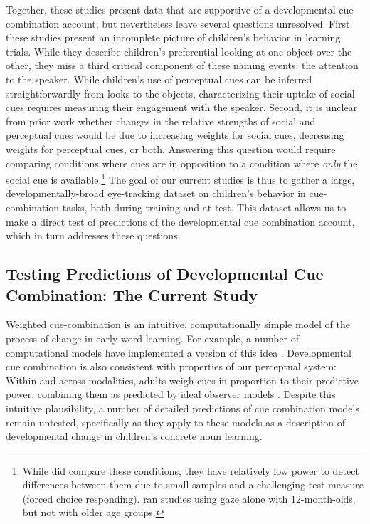 \documentclass[man,floatsintext]{apa6}
\begin{document}
Together, these studies present data that are supportive of a developmental cue combination account, but nevertheless leave several questions unresolved. First, these studies present an incomplete picture of children's behavior in learning trials. While they describe children's preferential looking at one object over the other, they miss a third critical component of these naming events: the attention to the speaker. While children's use of perceptual cues can be inferred straightforwardly from looks to the objects, characterizing their uptake of social cues requires measuring their engagement with the speaker. Second, it is unclear from prior work whether changes in the relative strengths of social and perceptual cues would be due to increasing weights for social cues, decreasing weights for perceptual cues, or both. Answering this question would require comparing conditions where cues are in opposition to a condition where \emph{only} the social cue is available.\footnote{While  did compare these conditions, they have relatively low power to detect differences between them due to small samples and a challenging test measure (forced choice responding).  ran studies using gaze alone with 12-month-olds, but not with older age groups.} The goal of our current studies is thus to gather a large, developmentally-broad eye-tracking dataset on children's behavior in cue-combination tasks, both during training and at test. This dataset allows us to make a direct test of predictions of the developmental cue combination account, which in turn addresses these questions.

\subsection{Testing Predictions of Developmental Cue Combination: The Current Study}

Weighted cue-combination is an intuitive, computationally simple model of the process of change in early word learning. For example, a number of computational models have implemented a version of this idea  \cite{Frank2007b,Yu2007b,Frank2013a}. Developmental cue combination is also consistent with properties of our perceptual system: Within and across modalities, adults weigh cues in proportion to their predictive power, combining them as predicted by ideal observer models \cite{Ernst2002, Jacobs2002}. Despite this intuitive plausibility, a number of detailed predictions of cue combination models remain untested, specifically as they apply to these models as a description of developmental change in children's concrete noun learning. 
\end{document}
